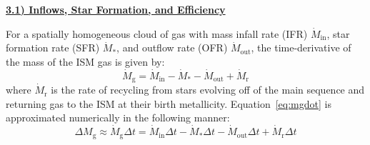 \documentclass{report}
\begin{document}
\newpage 
\noindent 
\begin{center}
\hypertarget{gas:inflows}{
	\underline{\LARGE
		\textbf{3.1) Inflows, Star Formation, and Efficiency}
	}
}
\end{center}
\par\noindent 
For a spatially homogeneous cloud of gas with mass infall rate (IFR) 
$\dot{M}_\text{in}$, star formation rate (SFR) $\dot{M}_*$, and outflow rate 
(OFR) $\dot{M}_\text{out}$, the time-derivative of the mass of the ISM gas is 
given by: 
\begin{equation}
\label{eq:mgdot}
\dot{M}_\text{g} = \dot{M}_\text{in} - \dot{M}_* - \dot{M}_\text{out} + 
\dot{M}_\text{r} 
\end{equation}
where $\dot{M}_\text{r}$ is the rate of recycling from stars evolving off of 
the main sequence and returning gas to the ISM at their birth metallicity. 
Equation~\ref{eq:mgdot} is approximated numerically in the following manner: 
\begin{equation}
\Delta M_\text{g} \approx \dot{M}_\text{g}\Delta t = \dot{M}_\text{in}\Delta t 
- \dot{M}_*\Delta t - \dot{M}_\text{out}\Delta t + \dot{M}_\text{r}\Delta t
\end{equation}
\end{document}
